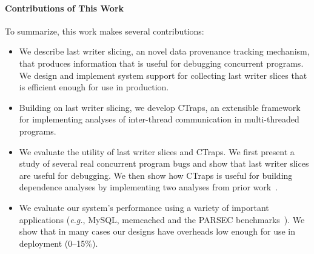 \documentclass[preprint,9pt]{sigplanconf}
\newcommand{\ctraps}{CTraps\xspace}
\begin{document}
\paragraph{Contributions of This Work}
To summarize, this work makes several contributions:
\begin{itemize}

\item{We describe last writer slicing, an novel data provenance tracking
mechanism, that produces information that is useful for debugging concurrent
programs.  We design and implement system support for collecting last writer
slices that is efficient enough for use in production.  }

\item{Building on last writer slicing, we develop \ctraps, an extensible
framework for implementing analyses of inter-thread communication in
multi-threaded programs.  }

\item{We evaluate the utility of last writer slices and \ctraps. We first
present a study of several real concurrent program bugs and show that last
writer slices are useful for debugging.  We then show how \ctraps is useful for
building dependence analyses by implementing two analyses from prior
work~\cite{cci,defuse,recon}. }

\item{We evaluate our system's performance using a variety of important
applications ({\em e.g.}, MySQL, memcached and the PARSEC
benchmarks~\cite{parsec}).  We show that in many cases our designs have
overheads low enough for use in deployment (0--15\%).}

\end{itemize}




\end{document}
